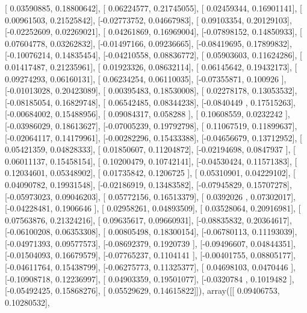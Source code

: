 \documentclass{article}
\begin{document}
       [ 0.03590885,  0.18800642],
       [ 0.06224577,  0.21745055],
       [ 0.02459344,  0.16901141],
       [ 0.00961503,  0.21525842],
       [-0.02773752,  0.04667983],
       [ 0.09103354,  0.20129103],
       [-0.02252609,  0.02269021],
       [ 0.04261869,  0.16969004],
       [-0.07898152,  0.14850933],
       [ 0.07604778,  0.03262832],
       [-0.01497166,  0.09236665],
       [-0.08419695,  0.17899832],
       [-0.10076214,  0.14835454],
       [-0.04210558,  0.08836772],
       [ 0.05903603,  0.11624286],
       [ 0.01417487,  0.21235961],
       [ 0.01923326,  0.08632114],
       [ 0.06145642,  0.19432173],
       [ 0.09274293,  0.06160131],
       [ 0.06234254,  0.06110035],
       [-0.07355871,  0.100926  ],
       [-0.01013028,  0.20423089],
       [ 0.00395483,  0.18530008],
       [ 0.02278178,  0.13053532],
       [-0.08185054,  0.16829748],
       [ 0.06542485,  0.08344238],
       [-0.0840449 ,  0.17515263],
       [-0.00684002,  0.15488956],
       [ 0.09084317,  0.058288  ],
       [ 0.10608559,  0.0232242 ],
       [-0.03986029,  0.18613627],
       [-0.07005239,  0.19792798],
       [ 0.11067519,  0.11899637],
       [-0.02064117,  0.14179961],
       [-0.00282296,  0.15433388],
       [-0.04656679,  0.13712952],
       [ 0.05421359,  0.04828333],
       [ 0.01850607,  0.11204872],
       [-0.02194698,  0.0847937 ],
       [ 0.06011137,  0.15458154],
       [ 0.10200479,  0.10742141],
       [-0.04530424,  0.11571383],
       [ 0.12034601,  0.05348902],
       [ 0.01735842,  0.1206725 ],
       [ 0.05310901,  0.04229102],
       [ 0.04090782,  0.19931548],
       [-0.02186919,  0.13483582],
       [-0.07945829,  0.15707278],
       [-0.05973023,  0.09046203],
       [ 0.05772156,  0.16513379],
       [ 0.0392026 ,  0.07302017],
       [-0.04228481,  0.1906646 ],
       [ 0.02958261,  0.04893509],
       [ 0.03528064,  0.20916981],
       [ 0.07563876,  0.21324216],
       [ 0.09635617,  0.09660931],
       [-0.08835832,  0.20364617],
       [-0.06100208,  0.06353308],
       [ 0.00805498,  0.18300154],
       [-0.06780113,  0.11193039],
       [-0.04971393,  0.09577573],
       [-0.08692379,  0.1920739 ],
       [-0.09496607,  0.04844351],
       [-0.01504093,  0.16679579],
       [-0.07765237,  0.1104141 ],
       [-0.00401755,  0.08805177],
       [-0.04611764,  0.15438799],
       [-0.06275773,  0.11325377],
       [ 0.04698103,  0.0470446 ],
       [-0.10908718,  0.12236997],
       [ 0.04903359,  0.19501077],
       [-0.0320784 ,  0.1019482 ],
       [-0.05492425,  0.15868276],
       [ 0.05529629,  0.14615822]]), array([[ 0.09406753,  0.10280532],
\end{document}

